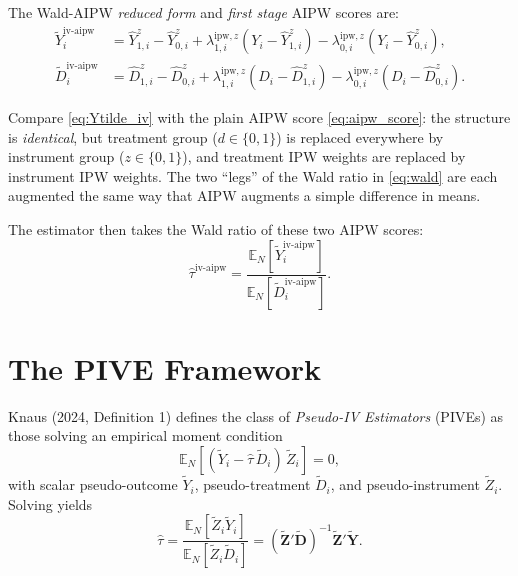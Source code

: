 \documentclass[12pt, a4paper]{article}
\theoremstyle{condstyle}
\theoremstyle{plain}
\newcommand{\EN}{\mathbb{E}_N}
\newcommand{\tiv}{\hat{\tau}^{\mathrm{iv\text{-}aipw}}}
\begin{document}
The Wald-AIPW \emph{reduced form} and \emph{first stage} AIPW scores are:
\begin{align}
  \tilde{Y}^{\mathrm{iv\text{-}aipw}}_i
  &= \hat{Y}^z_{1,i} - \hat{Y}^z_{0,i}
     + \lambda^{\mathrm{ipw},z}_{1,i}(Y_i - \hat{Y}^z_{1,i})
     - \lambda^{\mathrm{ipw},z}_{0,i}(Y_i - \hat{Y}^z_{0,i}),
  \label{eq:Ytilde_iv}\\[4pt]
  \tilde{D}^{\mathrm{iv\text{-}aipw}}_i
  &= \hat{D}^z_{1,i} - \hat{D}^z_{0,i}
     + \lambda^{\mathrm{ipw},z}_{1,i}(D_i - \hat{D}^z_{1,i})
     - \lambda^{\mathrm{ipw},z}_{0,i}(D_i - \hat{D}^z_{0,i}).
  \label{eq:Dtilde_iv}
\end{align}

\begin{notebox}
Compare \eqref{eq:Ytilde_iv} with the plain AIPW score \eqref{eq:aipw_score}:
the structure is \emph{identical}, but treatment group ($d\in\{0,1\}$) is
replaced everywhere by instrument group ($z\in\{0,1\}$), and
treatment IPW weights are replaced by instrument IPW weights.
The two ``legs'' of the Wald ratio in \eqref{eq:wald} are each
augmented the same way that AIPW augments a simple difference in means.
\end{notebox}

The estimator then takes the Wald ratio of these two AIPW scores:
\begin{equation}
  \tiv
  = \frac{\EN[\tilde{Y}^{\mathrm{iv\text{-}aipw}}_i]}%
         {\EN[\tilde{D}^{\mathrm{iv\text{-}aipw}}_i]}.
  \label{eq:wald_aipw}
\end{equation}

\section{The PIVE Framework}
\label{sec:pive}

Knaus (2024, Definition 1) defines the class of \emph{Pseudo-IV Estimators} (PIVEs)
as those solving an empirical moment condition
\begin{equation}
  \EN\!\left[(\tilde{Y}_i - \hat\tau\,\tilde{D}_i)\,\tilde{Z}_i\right] = 0,
  \label{eq:moment}
\end{equation}
with scalar pseudo-outcome $\tilde{Y}_i$, pseudo-treatment $\tilde{D}_i$, and
pseudo-instrument $\tilde{Z}_i$.
Solving yields
\begin{equation}
  \hat\tau
  = \frac{\EN[\tilde{Z}_i\tilde{Y}_i]}{\EN[\tilde{Z}_i\tilde{D}_i]}
  = (\tilde{\mathbf{Z}}'\tilde{\mathbf{D}})^{-1}\tilde{\mathbf{Z}}'\tilde{\mathbf{Y}}.
  \label{eq:pive_sol}
\end{equation}
\end{document}
